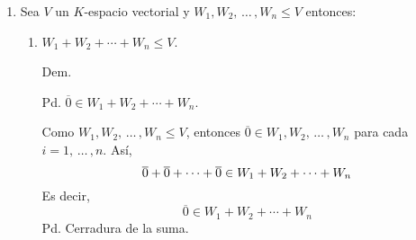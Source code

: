\documentclass[fleqn]{article}
\begin{document}
\begin{enumerate}
        \item Sea $ V $ un $ K $-espacio vectorial y $ W_1, W_2, \, \ldots \, , W_n \leq V $ entonces:
        \begin{enumerate}
            \item $	W_1 + W_2 + \cdots + W_n \leq V $. \par
            \hspace{2.7mm}  Dem. \par

            Pd. $ \overline{0} \in W_1 + W_2 + \cdots + W_n $. \par

            Como $ W_1, W_2,  \, \ldots \, , W_n \leq V $, entonces $ \overline{0} \in W_1, W_2, \, \ldots \, , W_n $ para cada $ i=1, \, \ldots \, ,n $. Así,
            \begin{equation*}
                \overline{0} + \overline{0} + \cdots + \overline{0} \in W_1 + W_2 + \cdots + W_n \\\\
            \end{equation*}
            Es decir,
            \begin{equation*}
                \overline{0} \in W_1 + W_2 + \cdots + W_n
            \end{equation*}
            Pd. Cerradura de la suma. \par


\end{enumerate}
\end{enumerate}
\end{document}
